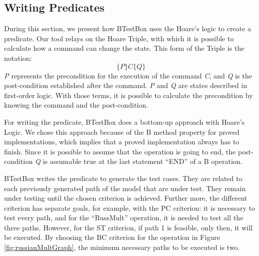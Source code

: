 \documentclass[runningheads]{llncs}
\begin{document}
\subsection{Writing Predicates} \label{writingPredicates}

During this section, we present how BTestBox uses the Hoare’s logic to create a predicate. Our tool relays on the Hoare Triple, with which it is possible to calculate how a command can change the state. 
This form of the Triple is the notation:
\nolinebreak[4] $$\{P\} C \{Q\}$$ \nolinebreak[4]
\textit{P} represents the precondition for the execution of the command \textit{C}, and \textit{Q} is the post-condition established after the command. \textit{P} and \textit{Q} are states described in first-order logic. With those terms, it is possible to calculate the precondition by knowing the command and the post-condition. 

For writing the predicate, BTestBox does a bottom-up approach with Hoare's Logic. We chose this approach because of the B method property for proved implementations, which implies that a proved implementation always has to finish. Since it is possible to assume that the operation is going to end, the post-condition \textit{Q} is assumable true at the last statement ``END'' of a B operation.


 BTestBox writes the predicate to generate the test cases. They are related to each previously generated path of the model that are under test. They remain under testing until the chosen criterion is achieved. Further more, the different criterion has separate goals, for example, with the PC criterion: it is necessary to test every path, and for the ``RussMult'' operation, it is needed to test all the three paths. However, for the ST criterion, if path 1 is feasible, only then, it will be executed. By choosing the BC criterion for the operation in Figure \ref{fig:russianMultGraph}, the minimum necessary paths to be executed is two.
\end{document}
